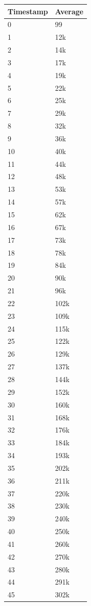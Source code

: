 %
%
\begin{tabular}{|l||l|}
\hline
	\textbf{Timestamp} & \textbf{Average} \\ \hline
	0 & 99 \\ \hline
	1 & 12k \\ \hline
	2 & 14k \\ \hline
	3 & 17k \\ \hline
	4 & 19k \\ \hline
	5 & 22k \\ \hline
	6 & 25k \\ \hline
	7 & 29k \\ \hline
	8 & 32k \\ \hline
	9 & 36k \\ \hline
	10 & 40k \\ \hline
	11 & 44k \\ \hline
	12 & 48k \\ \hline
	13 & 53k \\ \hline
	14 & 57k \\ \hline
	15 & 62k \\ \hline
	16 & 67k \\ \hline
	17 & 73k \\ \hline
	18 & 78k \\ \hline
	19 & 84k \\ \hline
	20 & 90k \\ \hline
	21 & 96k \\ \hline
	22 & 102k \\ \hline
	23 & 109k \\ \hline
	24 & 115k \\ \hline
	25 & 122k \\ \hline
	26 & 129k \\ \hline
	27 & 137k \\ \hline
	28 & 144k \\ \hline
	29 & 152k \\ \hline
	30 & 160k \\ \hline
	31 & 168k \\ \hline
	32 & 176k \\ \hline
	33 & 184k \\ \hline
	34 & 193k \\ \hline
	35 & 202k \\ \hline
	36 & 211k \\ \hline
	37 & 220k \\ \hline
	38 & 230k \\ \hline
	39 & 240k \\ \hline
	40 & 250k \\ \hline
	41 & 260k \\ \hline
	42 & 270k \\ \hline
	43 & 280k \\ \hline
	44 & 291k \\ \hline
	45 & 302k \\ \hline
\end{tabular}
